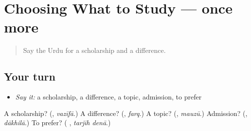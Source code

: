 \section[(dialogue)]{Choosing What to Study — once more}

\label{lesson:UR-R385-review-final-385}



\begin{quote}
Say the Urdu for a scholarship and a difference.
\end{quote}

\subsection*{Your turn}
\begin{itemize}
\raggedright
  \item \emph{Say it:} a scholarship, a difference, a topic, admission, to prefer
\end{itemize}

\begin{tcolorbox}[breakable,colback=teal!4,colframe=teal!35!black,title={Before you move on}]
A scholarship? (\textbf{}, \emph{vazīfā}.) A difference? (\textbf{}, \emph{farq}.) A topic? (\textbf{}, \emph{mauzū}.) Admission? (\textbf{}, \emph{dākhilā}.) To prefer? (\textbf{ }, \emph{tarjīh denā}.)
\end{tcolorbox}
